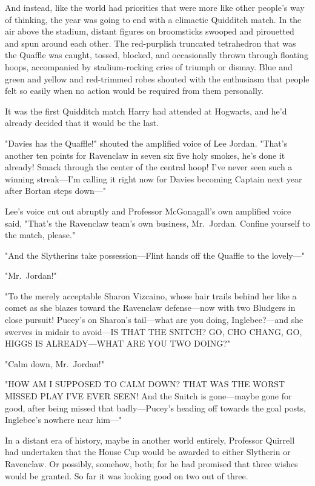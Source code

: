 And instead, like the world had priorities that were more like other people's
way of thinking, the year was going to end with a climactic Quidditch match.
\sbreak
In the air above the stadium, distant figures on broomsticks swooped and
pirouetted and spun around each other. The red-purplish truncated tetrahedron
that was the Quaffle was caught, tossed, blocked, and occasionally thrown
through floating hoops, accompanied by stadium-rocking cries of triumph or
dismay. Blue and green and yellow and red-trimmed robes shouted with the
enthusiasm that people felt so easily when no action would be required from
them personally.

It was the first Quidditch match Harry had attended at Hogwarts, and he'd
already decided that it would be the last.

"Davies has the Quaffle!" shouted the amplified voice of Lee Jordan. "That's
another ten points for Ravenclaw in seven{\el} six{\el} five{\el} holy
smokes, he's done it already! Smack through the center of the central hoop!
I've never seen such a winning streak—I'm calling it right now for Davies
becoming Captain next year after Bortan steps down—"

Lee's voice cut out abruptly and Professor McGonagall's own amplified voice
said, "That's the Ravenclaw team's own business, Mr.~Jordan. Confine yourself
to the match, please."

"And the Slytherins take possession—Flint hands off the Quaffle to the
lovely—"

"Mr.~Jordan!"

"To the merely acceptable Sharon Vizcaino, whose hair trails behind her like a
comet as she blazes toward the Ravenclaw defense—now with two Bludgers in
close pursuit! Pucey's on Sharon's tail—what are you doing, Inglebee?—and
she swerves in midair to avoid—IS THAT THE SNITCH? GO, CHO CHANG, GO, HIGGS
IS ALREADY—WHAT ARE YOU TWO DOING?"

"Calm down, Mr.~Jordan!"

"HOW AM I SUPPOSED TO CALM DOWN? THAT WAS THE WORST MISSED PLAY I'VE EVER SEEN!
And the Snitch is gone—maybe gone for good, after being missed that
badly—Pucey's heading off towards the goal posts, Inglebee's nowhere near
him—"

In a distant era of history, maybe in another world entirely, Professor
Quirrell had undertaken that the House Cup would be awarded to either Slytherin
or Ravenclaw. Or possibly, somehow, both; for he had promised that three wishes
would be granted. So far it was looking good on two out of three.

